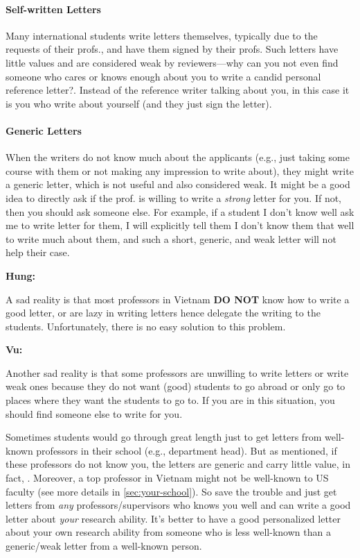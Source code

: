 \documentclass[oneside,11pt]{memoir}
\newenvironment{commentbox}[1][]{
  \small
  \begin{mybox}
    {\small \textbf{#1}}
  }{
  \end{mybox}
}
\newcommand{\red}[1]{{\color{red}{#1}}}
\begin{document}
\paragraph{Self-written Letters} Many international students write letters themselves, typically due to the requests of their profs., and have them signed by their profs. Such letters have little values and are considered weak by reviewers---why can you not even find someone who cares or knows enough about you to write a candid personal reference letter?.  Instead of the reference writer talking about you, in this case it is you who write about yourself (and they just sign the letter).

\paragraph{Generic Letters} When the writers do not know much about the applicants (e.g., just taking some course with them or not making any impression to write about), they might write a generic letter, which is not useful and also considered weak.  It might be a good idea to directly ask if the prof. is willing to write a \emph{strong} letter for you. If not, then you should ask someone else.  For example, if a student I don't know well ask me to write letter for them, I will explicitly tell them I don't know them that well to write much about them, and such a short, generic, and weak letter will not help their case.

\begin{commentbox}[Hung:]
  A sad reality is that most professors in Vietnam \textbf{DO NOT} know how to write a good letter, or are lazy in writing letters hence delegate the writing to the students. Unfortunately, there is no easy solution to this problem.
\end{commentbox}

\begin{commentbox}[Vu:]

  Another sad reality is that some professors are unwilling to write letters or write weak ones because they do not want (good) students to go abroad or only go to places where they want the students to go to. If you are in this situation, you should find someone else to write for you.
  \tcblower

  Sometimes students would go through great length just to get letters from well-known professors in their school (e.g., department head). But as mentioned, if these professors do not know you, the letters are generic and carry little value, in fact, \red{red flags}. Moreover, a top professor in Vietnam might not be well-known to US faculty (see more details in \autoref{sec:your-school}). So save the trouble and just get letters from \emph{any} professors/supervisors who knows you well and can write a good letter about \emph{your} research ability. It's better to have a good personalized
  letter about your own research ability from someone who is less
  well-known than a generic/weak letter from a well-known person.
  
\end{commentbox}
\end{document}
